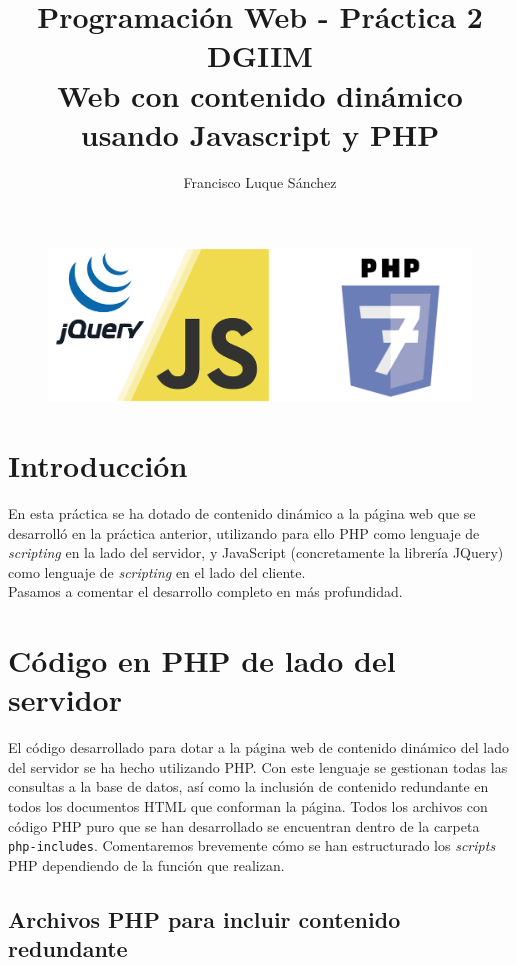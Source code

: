 \documentclass[11pt]{article}
\theoremstyle{plain}
\theoremstyle{definition}
\begin{document}
\title{Programación Web - Práctica 2\\
  DGIIM \\
  \large Web con contenido dinámico usando Javascript y PHP}
\author{Francisco Luque Sánchez}
\maketitle

\begin{figure}[H]
  \centering
  \includegraphics[width=.5\textwidth]{js_php.png}
\end{figure}


\section{Introducción}

En esta práctica se ha dotado de contenido dinámico a la página web
que se desarrolló en la práctica anterior, utilizando para ello PHP
como lenguaje de \textit{scripting} en la lado del servidor, y
JavaScript (concretamente la librería JQuery) como lenguaje
de \textit{scripting} en el lado del cliente.\\

Pasamos a comentar el desarrollo completo en más profundidad.

\section{Código en PHP de lado del servidor}

El código desarrollado para dotar a la página web de contenido
dinámico del lado del servidor se ha hecho utilizando PHP. Con este
lenguaje se gestionan todas las consultas a la base de datos, así como
la inclusión de contenido redundante en todos los documentos HTML que
conforman la página. Todos los archivos con código PHP puro que se
han desarrollado se encuentran dentro de la carpeta
\texttt{php-includes}. Comentaremos brevemente cómo se han
estructurado los \textit{scripts} PHP dependiendo de la función que
realizan.

\subsection{Archivos PHP para incluir contenido redundante}
\end{document}
